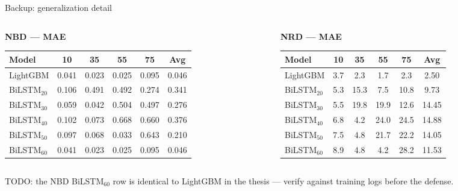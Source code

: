 \documentclass[11pt,aspectratio=169]{beamer}
\begin{document}
\begin{frame}{Backup: generalization detail}
  {\scriptsize
  \begin{columns}[T]
    \begin{column}{0.5\textwidth}
      \centering\textbf{NBD --- MAE}\\[0.2em]
      \begin{tabular}{@{}lcccc c@{}}
        \toprule
        Model & 10 & 35 & 55 & 75 & Avg\\
        \midrule
        LightGBM & 0.041 & 0.023 & 0.025 & 0.095 & 0.046\\
        BiLSTM$_{20}$ & 0.106 & 0.491 & 0.492 & 0.274 & 0.341\\
        BiLSTM$_{30}$ & 0.059 & 0.042 & 0.504 & 0.497 & 0.276\\
        BiLSTM$_{40}$ & 0.102 & 0.073 & 0.668 & 0.660 & 0.376\\
        BiLSTM$_{50}$ & 0.097 & 0.068 & 0.033 & 0.643 & 0.210\\
        BiLSTM$_{60}$ & 0.041 & 0.023 & 0.025 & 0.095 & 0.046\\
        \bottomrule
      \end{tabular}
    \end{column}
    \begin{column}{0.5\textwidth}
      \centering\textbf{NRD --- MAE}\\[0.2em]
      \begin{tabular}{@{}lcccc c@{}}
        \toprule
        Model & 10 & 35 & 55 & 75 & Avg\\
        \midrule
        LightGBM & 3.7 & 2.3 & 1.7 & 2.3 & 2.50\\
        BiLSTM$_{20}$ & 5.3 & 15.3 & 7.5 & 10.8 & 9.73\\
        BiLSTM$_{30}$ & 5.5 & 19.8 & 19.9 & 12.6 & 14.45\\
        BiLSTM$_{40}$ & 6.8 & 4.2 & 24.0 & 24.5 & 14.88\\
        BiLSTM$_{50}$ & 7.5 & 4.8 & 21.7 & 22.2 & 14.05\\
        BiLSTM$_{60}$ & 8.9 & 4.8 & 4.2 & 28.2 & 11.53\\
        \bottomrule
      \end{tabular}
    \end{column}
  \end{columns}}
  {\scriptsize TODO: the NBD BiLSTM$_{60}$ row is identical to LightGBM in the
  thesis --- verify against training logs before the defense.}
\end{frame}
\end{document}
